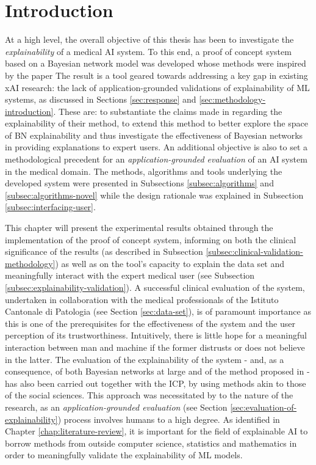 \section{Introduction} \label{sec:introduction-results}
At a high level, the overall objective of this thesis has been to investigate the \textit{explainability} of a medical AI system.
To this end, a proof of concept system based on a Bayesian network model was developed whose methods were inspired by the paper \citep{Butz2018}
The result is a tool geared towards addressing a key gap in existing xAI research: the lack of application-grounded validations of explainability of ML systems, as discussed in Sections \ref{sec:response} and \ref{sec:methodology-introduction}.
These are: to substantiate the claims made in \citep{Butz2018} regarding the explainability of their method, to extend this method to better explore the space of BN explainability and thus investigate the effectiveness of Bayesian networks in providing explanations to expert users.
 An additional objective is also to set a methodological precedent for an \textit{application-grounded evaluation} of an AI system in the medical domain.
The methods, algorithms and tools underlying the developed system were presented in Subsections \ref{subsec:algorithms} and \ref{subsec:algorithms-novel} while the design rationale was explained in Subsection \ref{subsec:interfacing-user}. 

This chapter will present the experimental results obtained through the implementation of the proof of concept system, informing on both the clinical significance of the results (as described in Subsection \ref{subsec:clinical-validation-methodology}) as well as on the tool's capacity to explain the data set and meaningfully interact with the expert medical user (see Subsection \ref{subsec:explainability-validation}).
A successful clinical evaluation of the system, undertaken in collaboration with the medical professionals of the Istituto Cantonale di Patologia (see Section \ref{sec:data-set}), is of paramount importance as this is one of the prerequisites for the effectiveness of the system and the user perception of its trustworthiness.
Intuitively, there is little hope for a meaningful interaction between man and machine if the former distrusts or does not believe in the latter.
The evaluation of the explainability of the system - and, as a consequence, of both Bayesian networks at large and of the method proposed in \citep{Butz2018} - has also been carried out together with the ICP, by using methods akin to those of the social sciences.
This approach was necessitated by to the nature of the research, as an \textit{application-grounded evaluation} (see Section \ref{sec:evaluation-of-explainability}) process involves humans to a high degree.
As identified in Chapter \ref{chap:literature-review}, it is important for the field of explainable AI to borrow methods from outside computer science, statistics and mathematics in order to meaningfully validate the explainability of ML models.

